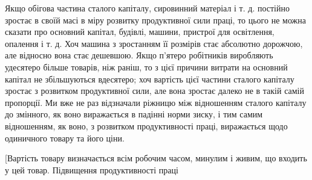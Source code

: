 Якщо обігова частина сталого капіталу, сировинний матеріал
і т. д. постійно зростає в своїй масі в міру розвитку продуктивної
сили праці, то цього не можна сказати про основний
капітал, будівлі, машини, пристрої для освітлення, опалення і т. д.
Хоч машина з зростанням її розмірів стає абсолютно дорожчою,
але відносно вона стає дешевшою. Якщо п’ятеро робітників
виробляють удесятеро більше товарів, ніж раніш, то
з цієї причини витрати на основний капітал не збільшуються
вдесятеро; хоч вартість цієї частини сталого капіталу зростає
з розвитком продуктивної сили, але вона зростає далеко не в такій
самій пропорції. Ми вже не раз відзначали ріжницю між
відношенням сталого капіталу до змінного, як воно виражається
в падінні норми зиску, і тим самим відношенням, як воно,
з розвитком продуктивності праці, виражається щодо одиничного
товару та його ціни.

[Вартість товару визначається всім робочим часом, минулим
і живим, що входить у цей товар. Підвищення продуктивності праці
\parbreak{}  %
